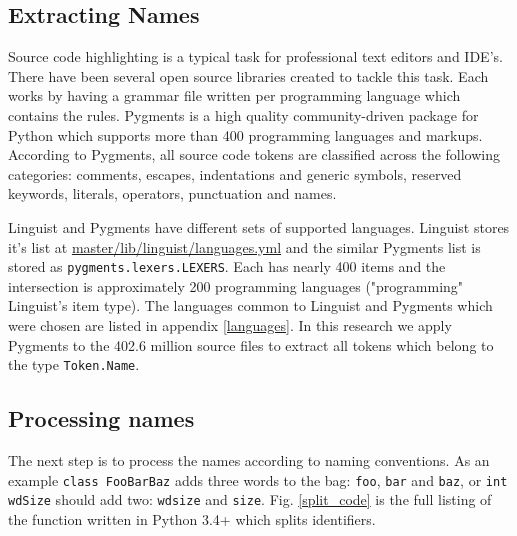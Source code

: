 \documentclass[conference,10pt]{IEEEtran}
\begin{document}
\subsection{Extracting Names}

Source code highlighting is a typical task for professional text editors and IDE's. There have been several open source libraries created to tackle this task. Each works by having a grammar file written per programming language which contains the rules. Pygments \cite{Pygments} is a high quality community-driven package for Python which supports more than 400 programming languages and markups. According to Pygments, all source code tokens are classified across the following categories: comments, escapes, indentations and generic symbols, reserved keywords, literals, operators, punctuation and names.

Linguist and Pygments have different sets of supported languages. Linguist stores it's list at \href{https://github.com/github/linguist/blob/master/lib/linguist/languages.yml}{master/lib/linguist/languages.yml} and the similar Pygments list is stored as \texttt{pygments.lexers.LEXERS}. Each has nearly 400 items and the intersection is approximately 200 programming languages ("programming" Linguist's item type). The languages common to Linguist and Pygments which were chosen are listed in appendix \ref{languages}. In this research we apply Pygments to the 402.6 million source files to extract all tokens which belong to the type \texttt{Token.Name}. 

\subsection{Processing names}

The next step is to process the names according to naming conventions. As an example \texttt{class FooBarBaz} adds three words to the bag: \texttt{foo}, \texttt{bar} and \texttt{baz}, or \texttt{int wdSize} should add two: \texttt{wdsize} and \texttt{size}. Fig. \ref{split_code} is the full listing of the function written in Python 3.4+ which splits identifiers.
\end{document}
